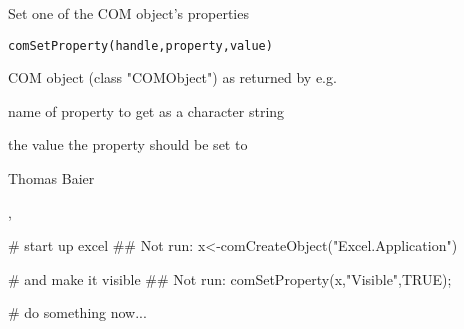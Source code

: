 \begin{Description}\relax
Set one of the COM object's properties
\end{Description}
\begin{Usage}
\begin{verbatim}
comSetProperty(handle,property,value)
\end{verbatim}
\end{Usage}
\begin{Arguments}
\begin{ldescription}
\item[\code{handle}] COM object (class "COMObject") as returned by e.g. 
\item[\code{property}] name of property to get as a character string
\item[\code{value}] the value the property should be set to
\end{ldescription}
\end{Arguments}
\begin{Author}\relax
Thomas Baier
\end{Author}
\begin{SeeAlso}\relax
{}, 
\end{SeeAlso}
\begin{Examples}
\begin{ExampleCode}
# start up excel
## Not run: x<-comCreateObject("Excel.Application")

# and make it visible
## Not run: comSetProperty(x,"Visible",TRUE);

# do something now...
\end{ExampleCode}
\end{Examples}

